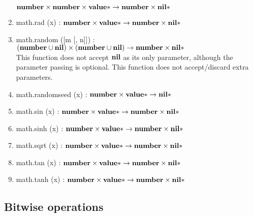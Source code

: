 \begin{enumerate}
$\mathbf{number} \times \mathbf{number} \times \mathbf{value}{*} \rightarrow \mathbf{number} \times \mathbf{nil}{*}$
\item math.rad (x) :
$\mathbf{number} \times \mathbf{value}{*} \rightarrow \mathbf{number} \times \mathbf{nil}{*}$
\item math.random ([m [, n]]) :
$(\mathbf{number} \cup \mathbf{nil}) \times
(\mathbf{number} \cup \mathbf{nil}) \rightarrow
\mathbf{number} \times
\mathbf{nil}{*}$
\\
This function does not accept $\mathbf{nil}$ as its only parameter,
although the parameter passing is optional.
This function does not accept/discard extra parameters.
\item math.randomseed (x) :
$\mathbf{number} \times \mathbf{value}{*} \rightarrow \mathbf{nil}{*}$
\item math.sin (x) :
$\mathbf{number} \times \mathbf{value}{*} \rightarrow \mathbf{number} \times \mathbf{nil}{*}$
\item math.sinh (x) :
$\mathbf{number} \times \mathbf{value}{*} \rightarrow \mathbf{number} \times \mathbf{nil}{*}$
\item math.sqrt (x) :
$\mathbf{number} \times \mathbf{value}{*} \rightarrow \mathbf{number} \times \mathbf{nil}{*}$
\item math.tan (x) :
$\mathbf{number} \times \mathbf{value}{*} \rightarrow \mathbf{number} \times \mathbf{nil}{*}$
\item math.tanh (x) :
$\mathbf{number} \times \mathbf{value}{*} \rightarrow \mathbf{number} \times \mathbf{nil}{*}$
\end{enumerate}

\subsection{Bitwise operations}

